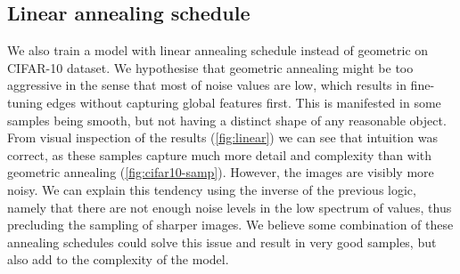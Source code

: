 \subsection{Linear annealing schedule}
We also train a model with linear annealing schedule instead of geometric on CIFAR-10 dataset. We hypothesise that geometric annealing might be too aggressive in the sense that most of noise values are low, which results in fine-tuning edges without capturing global features first. This is manifested in some samples being smooth, but not having a distinct shape of any reasonable object. From visual inspection of the results (\autoref{fig:linear}) we can see that intuition was correct, as these samples capture much more detail and complexity than with geometric annealing (\autoref{fig:cifar10-samp}). However, the images are visibly more noisy. We can explain this tendency using the inverse of the previous logic, namely that there are not enough noise levels in the low spectrum of values, thus precluding the sampling of sharper images. We believe some combination of these annealing schedules could solve this issue and result in very good samples, but also add to the complexity of the model.\vspace{-3mm}

